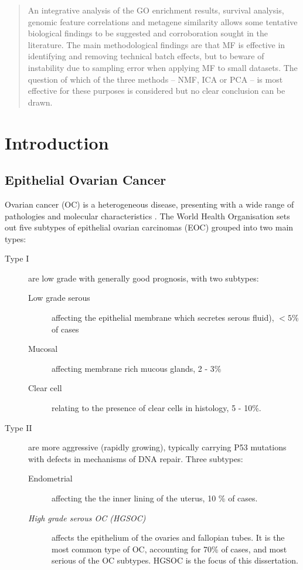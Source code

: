 \documentclass[tikz, 12pt,a4paper,oneside,fleqn]{article}
\begin{document}
\begin{abstract}
An integrative analysis of the GO enrichment results, survival analysis, genomic feature correlations and metagene similarity allows some tentative biological findings to be suggested and corroboration sought in the literature.  The main methodological findings are that MF is effective in identifying and removing technical batch effects, but to beware of instability due to sampling error when applying MF to small datasets.   The question of which of the three methods -- NMF, ICA or PCA -- is most effective for these purposes is considered but no clear conclusion can be drawn.

\end{abstract}
\newpage


\section{Introduction}

\subsection{Epithelial Ovarian Cancer}
\label{sec-epithelial-ovarian-cancer}


Ovarian cancer (OC) is a heterogeneous disease, presenting with a wide range of pathologies and molecular characteristics .  The World Health Organisation sets out five subtypes of epithelial ovarian carcinomas (EOC) grouped into two main types\cite{Kossai2018, Lisio2019}: 

\begin{description}
\item[Type I] are low grade with generally good prognosis, with two subtypes:
\begin{description}
\item[Low grade serous] affecting the epithelial membrane which secretes serous fluid), $< 5$\% of cases
\item[Mucosal] affecting membrane rich mucous glands, 2 - 3\% 
\item[Clear cell] relating to the presence of clear cells in histology, 5 - 10\%.
\end{description}
\item[Type II] are more aggressive (rapidly growing), typically carrying P53 mutations with defects in mechanisms of DNA repair. Three subtypes:
\begin{description}
\item[Endometrial] affecting the the inner lining of the uterus, 10 \% of cases.
\item[\emph{High grade serous OC (HGSOC)}] affects the epithelium of the ovaries and fallopian tubes.  It is the most common type of OC, accounting for 70\% of cases, and most serious of the OC subtypes.  HGSOC is the focus of this dissertation.
\end{description}
\end{description}
\end{document}
